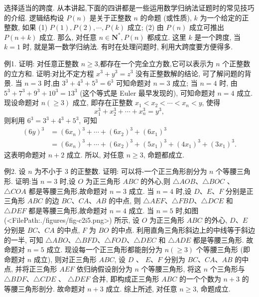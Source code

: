 
选择适当的跨度.
从本讲起,下面的四讲都是一些运用数学归纳法证题时的常见技巧的介绍.
逻辑结构设 $P(n)$ 是关于正整数 $n$ 的命题 (或性质), $k$ 为一个给定的正整数, 如果
(1) $P(1), P(2), \cdots, P(k)$ 成立;
(2) 由 $P(n)$ 成立可推出 $P(n+k)$ 成立.
那么, 对任意 $n \in \mathbf{N}^*, P(n)$ 都成立.
这里 $k$ 是一个跨度, 当 $k=1$ 时, 就是第一数学归纳法.
有时在处理问题时, 利用大跨度要方便得多.



例1. 证明: 对任意正整数 $n \geqslant 3$,都存在一个完全立方数,它可以表示为 $n$ 个正整数的立方和.
证明:对比不定方程 $x^3+y^3=z^3$ 没有正整数解的结论, 可了解问题的背景.
当 $n=3$ 时,由 $3^3+4^3+5^3=6^3$ 可知命题对 $n=3$ 成立;
当 $n=4$ 时, 由 $5^3+7^3+9^3+10^3=13^3$ (这个等式是 Euler 最早发现的), 可知命题对 $n=4$ 成立.
现设命题对 $n(\geqslant 3)$ 成立, 即存在正整数 $x_1<x_2<\cdots<x_n<y$, 使得
$$
x_1^3+x_2^3+\cdots+x_n^3=y^3,
$$
则利用 $6^3=3^3+4^3+5^3$, 可知
$$
\begin{aligned}
(6 y)^3 & =\left(6 x_n\right)^3+\cdots+\left(6 x_2\right)^3+\left(6 x_1\right)^3 \\
& =\left(6 x_n\right)^3+\cdots+\left(6 x_2\right)^3+\left(5 x_1\right)^3+\left(4 x_1\right)^3+\left(3 x_1\right)^3 .
\end{aligned}
$$
这表明命题对 $n+2$ 成立.
所以, 对任意 $n \geqslant 3$, 命题都成立.



例2. 设 $n$ 为不小于 3 的正整数.
证明: 可以将-一个正三角形剖分为 $n$ 个等腰三角形.
证明:当 $n=3$ 时,设 $O$ 为正三角形 $A B C$ 的外心,则 $\triangle A O B 、 \triangle B O C$ 、 $\triangle C O A$ 都是等腰三角形,故命题对 $n=3$ 成立.
当 $n=4$ 时,设 $D 、 E 、 F$ 分别是正三角形 $A B C$ 的边 $B C 、 C A 、 A B$ 的中点, 则 $\triangle A E F 、 \triangle F B D 、 \triangle D C E$ 和 $\triangle D E F$ 都是等腰三角形,故命题对 $n=4$ 成立.
当 $n=5$ 时,如图 (<FilePath:./figures/fig-c2i5.png>) 所示, 设 $O$ 为正三角形 $A B C$ 的外心, $D 、 E$ 分别是 $B C 、 C A$ 的中点, $F$ 为 $B O$ 的中点.
利用直角三角形斜边上的中线等于斜边的一半, 可知 $\triangle A B O 、 \triangle B F D 、 \triangle F O D 、 \triangle D E C$ 和 $\triangle A D E$ 都是等腰三角形.
故命题对 $n=5$ 成立.
现设每一个正三角形都能剖分为 $n(\geqslant 3)$ 个等腰三角形 (即命题对 $n$ 成立), 则对正三角形 $A B C$, 设 $D$ 、 $E 、 F$ 分别为 $B C 、 C A 、 A B$ 的中点, 并将正三角形 $A E F$
依归纳假设剖分为 $n$ 个等腰三角形, 将这 $n$ 个三角形与 $\triangle B D F 、 \triangle C D E$ 、 $\triangle D E F$ 合并, 即构成正三角形 $A B C$ 的一个个数为 $n+3$ 的等腰三角形剖分.
故命题对 $n+3$ 成立.
综上所述, 对任意 $n \geqslant 3$, 命题成立.



